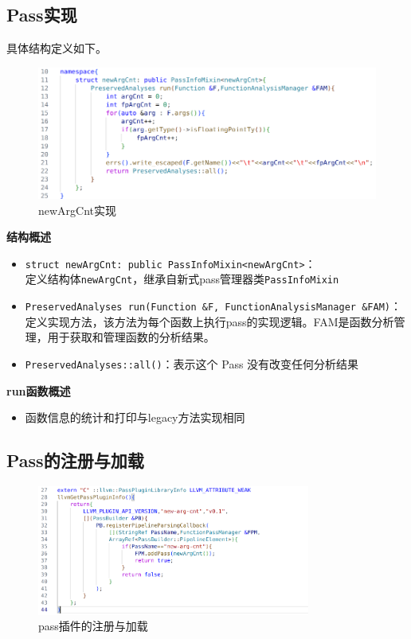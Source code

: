 \documentclass[11pt, a4paper, oneside,UTF8]{ctexart}
\begin{document}
\subsection{Pass实现}

具体结构定义如下。

\begin{figure}[h]
    \centering
    \includegraphics[width=1\textwidth]{./figure/new_2.png}
    \caption{newArgCnt实现}
    \label{figure:2.2}
\end{figure}

\textbf{结构概述}
\begin{itemize}[before=]
    \setlength{\itemsep}{0em}
    \item \texttt{struct newArgCnt: public PassInfoMixin<newArgCnt>}：\\定义结构体\texttt{newArgCnt}，继承自新式pass管理器类\texttt{PassInfoMixin}
    \item \texttt{PreservedAnalyses run(Function \&F, FunctionAnalysisManager \&FAM)}：\\定义实现方法，该方法为每个函数上执行pass的实现逻辑。FAM是函数分析管理，用于获取和管理函数的分析结果。
    \item \texttt{PreservedAnalyses::all()}：表示这个 Pass 没有改变任何分析结果
\end{itemize}

\textbf{run函数概述}
\begin{itemize}[before=]
    \setlength{\itemsep}{0em}
    \item 函数信息的统计和打印与legacy方法实现相同
\end{itemize}

\subsection{Pass的注册与加载}

\begin{figure}[h]
    \centering
    \includegraphics[width=0.8\textwidth]{./figure/new_3.png}
    \caption{pass插件的注册与加载}
    \label{figure:2.3}
\end{figure}
\end{document}
